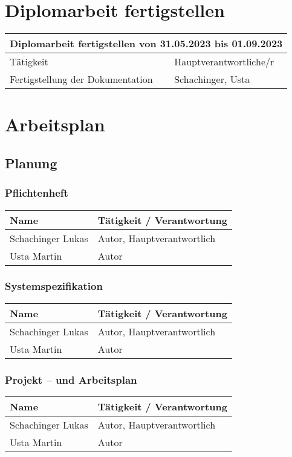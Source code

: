 \section{Diplomarbeit fertigstellen}
\begin{tabular}{|m{}|m{}|}
\hline
\multicolumn{2}{|c|}{\textbf{Diplomarbeit fertigstellen von 31.05.2023 bis 01.09.2023}} \\
\hline
Tätigkeit & Hauptverantwortliche/r \\
\hline
Fertigstellung der Dokumentation & Schachinger, Usta\\
\hline
\end{tabular}

\pagebreak

\section{Arbeitsplan}
\subsection{Planung}
\subsubsection{Pflichtenheft}
\begin{tabular}{|m{}|m{}|}
\hline
\textbf{Name} & \textbf{Tätigkeit / Verantwortung} \\
\hline
Schachinger Lukas & Autor, Hauptverantwortlich \\
\hline
Usta Martin & Autor \\
\hline
\end{tabular}

\subsubsection{Systemspezifikation}
\begin{tabular}{|m{}|m{}|}
\hline
\textbf{Name} & \textbf{Tätigkeit / Verantwortung} \\
\hline
Schachinger Lukas & Autor, Hauptverantwortlich \\
\hline
Usta Martin & Autor \\
\hline
\end{tabular}

\subsubsection{Projekt – und Arbeitsplan}
\begin{tabular}{|m{}|m{}|}
\hline
\textbf{Name} & \textbf{Tätigkeit / Verantwortung} \\
\hline
Schachinger Lukas & Autor, Hauptverantwortlich \\
\hline
Usta Martin & Autor \\
\hline
\end{tabular}
